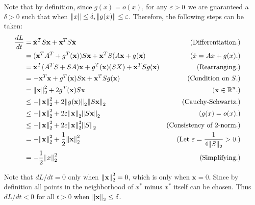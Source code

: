 \begin{solution}
\begin{enumerate}
        Note that by definition, since $g(x) = o(x)$, for any $\varepsilon > 0$ we are guaranteed a $\delta > 0$ such that when $\norm{x} \leq \delta, \norm{g(x)} \leq \varepsilon$. Therefore, the following steps can be taken:
        \vspace{-5mm}
        \alignbreak
        \vspace{-5mm}
        \begin{align}
            \frac{dL}{dt} &= \dot{\textbf{x}}^T S \textbf{x} + \textbf{x}^TS\dot{\textbf{x}} &\text{(Differentiation.)}\nonumber\\
            &= (\textbf{x}^TA^T + g^T(\textbf{x}))S\textbf{x} + \textbf{x}^TS(A\textbf{x} + g(\textbf{x}) &(\dot{x} = Ax + g(x).)\nonumber\\
            &= \textbf{x}^T(A^TS + SA)\textbf{x} + g^T(\textbf{x})(SX) + \textbf{x}^TSg(\textbf{x}) &\text{(Rearranging.)}\nonumber\\
            &= -\textbf{x}^T\textbf{x} + g^T(\textbf{x})S\textbf{x} + \textbf{x}^TSg(\textbf{x}) &\text{(Condition on $S$.)}\nonumber\\
            &= \norm{\textbf{x}}_2^2 + 2g^T(\textbf{x})S\textbf{x} &(\textbf{x} \in \mathbb{R}^n.)\nonumber\\
            &\leq -\norm{\textbf{x}}_2^2 + 2\norm{g(\textbf{x})}_2\norm{S\textbf{x}}_2 &\text{(Cauchy-Schwartz.)}\nonumber\\
            &\leq -\norm{\textbf{x}}_2^2 + 2\varepsilon \norm{\textbf{x}}_2\norm{S\textbf{x}}_2 &(g(x) = o(x).)\nonumber\\
            &\leq -\norm{\textbf{x}}_2^2 + 2\varepsilon \norm{\textbf{x}}_2^2\norm{S}_2 &\text{(Consistency of 2-norm.)}\nonumber\\
            &= -\norm{\textbf{x}}_2^2 + \frac{1}{2}\norm{\textbf{x}}_2^2 &\text{(Let $\varepsilon = \frac{1}{4\norm{S}_2} > 0.$)}\nonumber\\
            &= -\frac{1}{2}\norm{x}_2^2 &\text{(Simplifying.)}\nonumber
        \end{align}
        \alignbreak

        Note that $dL/dt = 0$ only when $\norm{\textbf{x}}_2^2 = 0$, which is only when $\textbf{x} = 0$. Since by definition all points in the neighborhood of $x^*$ minus $x^*$ itself can be chosen. Thus $dL/dt < 0$ for all $t > 0$ when $\norm{\textbf{x}}_2 \leq \delta$.  
    \end{enumerate}
\end{solution}
